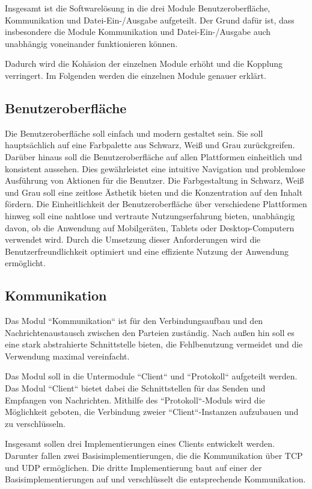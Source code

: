 \label{sc:architektur}

Insgesamt ist die Softwarelösung in die drei Module Benutzeroberfläche, Kommunikation und Datei-Ein-/Ausgabe aufgeteilt. Der Grund dafür ist, dass insbesondere die Module Kommunikation und Datei-Ein-/Ausgabe auch unabhängig voneinander funktionieren können.

Dadurch wird die Kohäsion der einzelnen Module erhöht und die Kopplung verringert. Im Folgenden werden die einzelnen Module genauer erklärt.

\subsection{Benutzeroberfläche}
Die Benutzeroberfläche soll einfach und modern gestaltet sein. Sie soll hauptsächlich auf eine Farbpalette aus Schwarz, Weiß und Grau zurückgreifen. Darüber hinaus soll die Benutzeroberfläche auf allen Plattformen einheitlich und konsistent aussehen.
Dies gewährleistet eine intuitive Navigation und problemlose Ausführung von Aktionen für die Benutzer. Die Farbgestaltung in Schwarz, Weiß und Grau soll eine zeitlose Ästhetik bieten und die Konzentration auf den Inhalt fördern. Die Einheitlichkeit der Benutzeroberfläche über verschiedene Plattformen hinweg soll eine nahtlose und vertraute Nutzungserfahrung bieten, unabhängig davon, ob die Anwendung auf Mobilgeräten, Tablets oder Desktop-Computern verwendet wird.
Durch die Umsetzung dieser Anforderungen wird die Benutzerfreundlichkeit optimiert und eine effiziente Nutzung der Anwendung ermöglicht.


\subsection{Kommunikation}
Das Modul “Kommunikation“ ist für den Verbindungsaufbau und den Nachrichtenaustausch zwischen den Parteien zuständig. Nach außen hin soll es eine stark abstrahierte Schnittstelle bieten, die Fehlbenutzung vermeidet und die Verwendung maximal vereinfacht.

Das Modul soll in die Untermodule “Client“ und “Protokoll“ aufgeteilt werden. Das Modul “Client“ bietet dabei die Schnittstellen für das Senden und Empfangen von Nachrichten. Mithilfe des “Protokoll“-Moduls wird die Möglichkeit geboten, die Verbindung zweier “Client“-Instanzen aufzubauen und zu verschlüsseln.

Insgesamt sollen drei Implementierungen eines Clients entwickelt werden. Darunter fallen zwei Basisimplementierungen, die die Kommunikation über TCP und UDP ermöglichen. Die dritte Implementierung baut auf einer der Basisimplementierungen auf und verschlüsselt die entsprechende Kommunikation.

